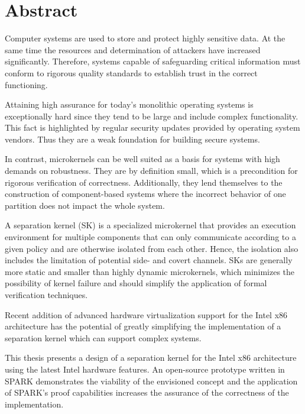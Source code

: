 \chapter*{Abstract}
Computer systems are used to store and protect highly sensitive data. At the
same time the resources and determination of attackers have increased
significantly. Therefore, systems capable of safeguarding critical information
must conform to rigorous quality standards to establish trust in the correct
functioning.

Attaining high assurance for today's monolithic operating systems is
exceptionally hard since they tend to be large and include complex
functionality. This fact is highlighted by regular security updates provided by
operating system vendors. Thus they are a weak foundation for building secure
systems.

In contrast, microkernels can be well suited as a basis for systems with high
demands on robustness. They are by definition small, which is a precondition
for rigorous verification of correctness. Additionally, they lend themselves to
the construction of component-based systems where the incorrect behavior of one
partition does not impact the whole system.

A separation kernel (SK) is a specialized microkernel that provides an
execution environment for multiple components that can only communicate
according to a given policy and are otherwise isolated from each other. Hence,
the isolation also includes the limitation of potential side- and covert
channels. SKs are generally more static and smaller than highly dynamic
microkernels, which minimizes the possibility of kernel failure and should
simplify the application of formal verification techniques.

Recent addition of advanced hardware virtualization support for the Intel x86
architecture has the potential of greatly simplifying the implementation of a
separation kernel which can support complex systems.

This thesis presents a design of a separation kernel for the Intel x86
architecture using the latest Intel hardware features. An open-source prototype
written in SPARK demonstrates the viability of the envisioned concept and the
application of SPARK's proof capabilities increases the assurance of the
correctness of the implementation.
